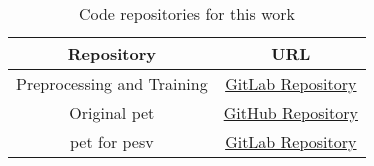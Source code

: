 
\begin{table}
    \centering
    \begin{tabular}{c|c}
       \hline
       \textbf{Repository}  & \textbf{URL} \\ \hline
       Preprocessing and Training   & \href{https://forgemia.inra.fr/luis-antonio.vasquez-reina/text-classification-for-bibliome}{GitLab Repository} \\
       Original \gls{pet} & \href{https://github.com/timoschick/pet}{GitHub Repository}\\
       \gls{pet} for \gls{pesv} & \href{https://forgemia.inra.fr/luis-antonio.vasquez-reina/pet_for_pesv}{GitLab Repository} \\ \hline
    \end{tabular}
    \caption{Code repositories for this work}
    \label{tab:06_code_repositories}
\end{table}